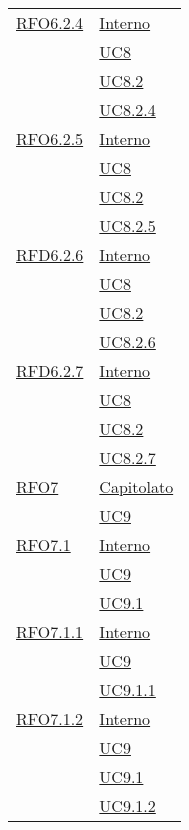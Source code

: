 \begin{longtable}{|>{\centering}m{5cm}|m{5cm}<{\centering}|}
  \hyperlink{RFO6.2.4}{RFO6.2.4} 
  & \hyperlink{Interno}{Interno}\\
  & \hyperref[UC8]{UC8}\\
  & \hyperref[UC8.2]{UC8.2}\\
  & \hyperref[UC8.2.4]{UC8.2.4}\\\hline
  
   \hyperlink{RFO6.2.5}{RFO6.2.5} 
   & \hyperlink{Interno}{Interno}\\
  & \hyperref[UC8]{UC8}\\
  & \hyperref[UC8.2]{UC8.2}\\
  & \hyperref[UC8.2.5]{UC8.2.5}\\\hline
  
   \hyperlink{RFD6.2.6}{RFD6.2.6} 
   & \hyperlink{Interno}{Interno}\\
  & \hyperref[UC8]{UC8}\\
  & \hyperref[UC8.2]{UC8.2}\\
  & \hyperref[UC8.2.6]{UC8.2.6}\\\hline
  
  \hyperlink{RFD6.2.7}{RFD6.2.7} 
   & \hyperlink{Interno}{Interno}\\
  & \hyperref[UC8]{UC8}\\
  & \hyperref[UC8.2]{UC8.2}\\
  & \hyperref[UC8.2.7]{UC8.2.7}\\\hline
  
   \hyperlink{RFO7}{RFO7} 
   & \hyperlink{Capitolato}{Capitolato}\\
  & \hyperref[UC9]{UC9}\\\hline
  
    \hyperlink{RFO7.1}{RFO7.1} 
    & \hyperlink{Interno}{Interno}\\
  & \hyperref[UC9]{UC9}\\
   & \hyperref[UC9.1]{UC9.1}\\\hline
   
    \hyperlink{RFO7.1.1}{RFO7.1.1} 
    & \hyperlink{Interno}{Interno}\\
   & \hyperref[UC9]{UC9}\\
   & \hyperref[UC9.1.1]{UC9.1.1}\\\hline
   
   \hyperlink{RFO7.1.2}{RFO7.1.2} 
   & \hyperlink{Interno}{Interno}\\
   & \hyperref[UC9]{UC9}\\
   & \hyperref[UC9.1]{UC9.1}\\
   & \hyperref[UC9.1.2]{UC9.1.2}\\\hline
   

\end{longtable}
